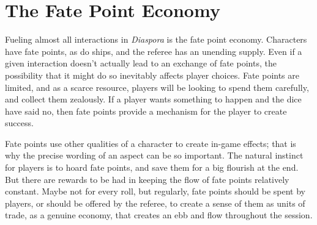 \section{The Fate Point Economy}\label{sec:the-fate-point-economy} %

Fueling almost all interactions in \emph{Diaspora} is the fate point economy. Characters have fate points, as do ships, and the referee has an unending supply. Even if a given interaction doesn't actually lead to an exchange of fate points, the possibility that it might do so inevitably affects player choices. Fate points are limited, and as a scarce resource, players will be looking to spend them carefully, and collect them zealously. If a player wants something to happen and the dice have said no, then fate points provide a mechanism for the player to create success.

Fate points use other qualities of a character to create in-game effects; that is why the precise wording of an aspect can be so important. The natural instinct for players is to hoard fate points, and save them for a big flourish at the end. But there are rewards to be had in keeping the flow of fate points relatively constant. Maybe not for every roll, but regularly, fate points should be spent by players, or should be offered by the referee, to create a sense of them as units of trade, as a genuine economy, that creates an ebb and flow throughout the session.

